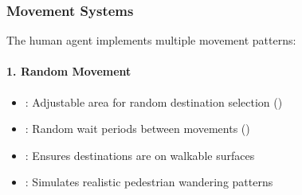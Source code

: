 \documentclass[letterpaper,10pt,english]{jupyterBook}
\begin{document}
\subsubsection{Movement Systems}
\label{\detokenize{Human Agent:movement-systems}}
\sphinxAtStartPar
The human agent implements multiple movement patterns:


\paragraph{1. Random Movement}
\label{\detokenize{Human Agent:random-movement}}
\begin{sphinxVerbatim}[commandchars=\\\{\}]

\end{sphinxVerbatim}

\sphinxAtStartPar
{}
\begin{itemize}
\item {} 
\sphinxAtStartPar
{}: Adjustable area for random destination selection ()

\item {} 
\sphinxAtStartPar
{}: Random wait periods between movements ()

\item {} 
\sphinxAtStartPar
{}: Ensures destinations are on walkable surfaces

\item {} 
\sphinxAtStartPar
{}: Simulates realistic pedestrian wandering patterns

\end{itemize}
\end{document}
